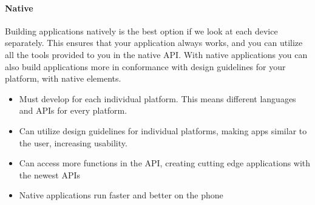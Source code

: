 \paragraph{\bf{Native}}
	Building applications natively is the best option if we look at each device
	separately. This ensures that your application always works, and you can
	utilize all the tools provided to you in the native API. With native
	applications you can also build applications more in conformance with design
	guidelines for your platform, with native elements.

	\begin{itemize}
		\item Must develop for each individual platform. This means different
		languages and APIs for every platform.
		\item Can utilize design guidelines for individual platforms, making
		apps similar to the user, increasing usability.
		\item Can access more functions in the API, creating cutting edge
		applications with the newest APIs
		\item Native applications run faster and better on the phone
	\end{itemize}
